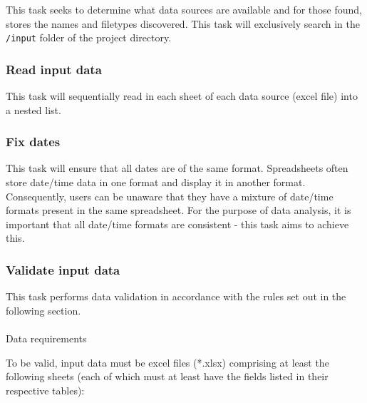 \documentclass[
  8pt,
  a4paper]{article}
\makeatletter
\let\oldparagraph\paragraph
\renewcommand{\paragraph}{
    \@ifstar
      \xxxParagraphStar
      \xxxParagraphNoStar
  }
\newcommand{\xxxParagraphStar}[1]{\oldparagraph*{#1}\mbox{}}
\newcommand{\xxxParagraphNoStar}[1]{\oldparagraph{#1}\mbox{}}
\makeatother
\begin{document}
This task seeks to determine what data sources are available and for
those found, stores the names and filetypes discovered. This task will
exclusively search in the \texttt{/input} folder of the project
directory.

\subsubsection{Read input data}\label{read-input-data}

This task will sequentially read in each sheet of each data source
(excel file) into a nested list.

\subsubsection{Fix dates}\label{fix-dates}

This task will ensure that all dates are of the same format.
Spreadsheets often store date/time data in one format and display it in
another format. Consequently, users can be unaware that they have a
mixture of date/time formats present in the same spreadsheet. For the
purpose of data analysis, it is important that all date/time formats are
consistent - this task aims to achieve this.

\subsubsection{Validate input data}\label{validate-input-data}

This task performs data validation in accordance with the rules set out
in the following section.

\paragraph{Data requirements}\label{sec-data-requirements}

To be valid, input data must be excel files (*.xlsx) comprising at least
the following sheets (each of which must at least have the fields listed
in their respective tables):
\end{document}
